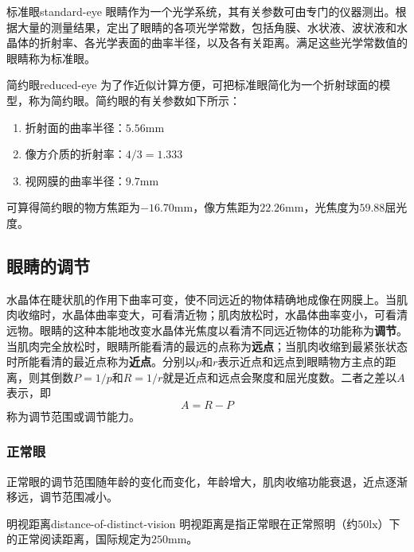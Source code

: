 \begin{definition}{标准眼}{standard-eye}
	眼睛作为一个光学系统，其有关参数可由专门的仪器测出。根据大量的测量结果，定出了眼睛的各项光学常数，包括角膜、水状液、波状液和水晶体的折射率、各光学表面的曲率半径，以及各有关距离。满足这些光学常数值的眼睛称为标准眼。
\end{definition}

\begin{definition}{简约眼}{reduced-eye}
	为了作近似计算方便，可把标准眼简化为一个折射球面的模型，称为简约眼。简约眼的有关参数如下所示：
	\begin{enumerate}
		\item 折射面的曲率半径：$5.56\mathrm{mm}$
		\item 像方介质的折射率：$4/3=1.333$
		\item 视网膜的曲率半径：$9.7\mathrm{mm}$
	\end{enumerate}
	可算得简约眼的物方焦距为$-16.70\mathrm{mm}$，像方焦距为$22.26\mathrm{mm}$，光焦度为$59.88$屈光度。
\end{definition}

\subsection{眼睛的调节}
水晶体在睫状肌的作用下曲率可变，使不同远近的物体精确地成像在网膜上。当肌肉收缩时，水晶体曲率变大，可看清近物；肌肉放松时，水晶体曲率变小，可看清远物。眼睛的这种本能地改变水晶体光焦度以看清不同远近物体的功能称为\textbf{调节}。当肌肉完全放松时，眼睛所能看清的最远的点称为\textbf{远点}；当肌肉收缩到最紧张状态时所能看清的最近点称为\textbf{近点}。分别以$p$和$r$表示近点和远点到眼睛物方主点的距离，则其倒数$P=1/p$和$R=1/r$就是近点和远点会聚度和屈光度数。二者之差以$A$表示，即
\begin{equation}
A=R-P
\end{equation}
称为调节范围或调节能力。

\subsubsection{正常眼}
正常眼的调节范围随年龄的变化而变化，年龄增大，肌肉收缩功能衰退，近点逐渐移远，调节范围减小。

\begin{definition}{明视距离}{distance-of-distinct-vision}
	明视距离是指正常眼在正常照明（约$50\mathrm{lx}$）下的正常阅读距离，国际规定为$250\mathrm{mm}$。
\end{definition}


